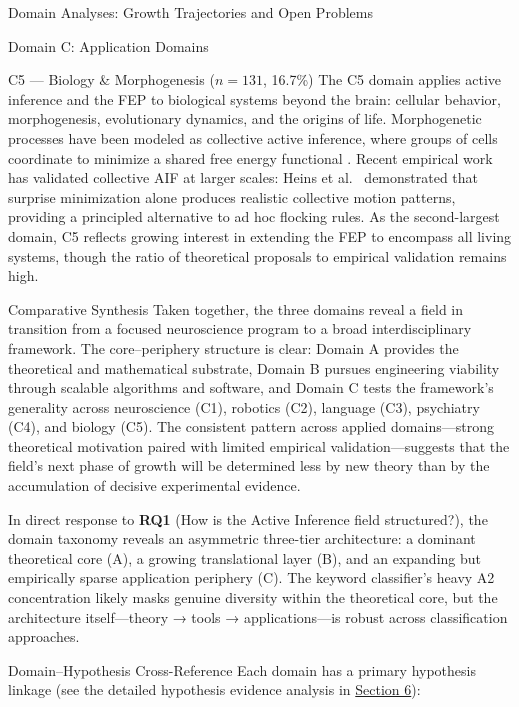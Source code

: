 \documentclass[
  ignorenonframetext,
]{beamer}
\begin{document}
\begin{frame}{Domain Analyses: Growth Trajectories and Open Problems
\label{sec:subfield_analyses}}
\begin{block}{Domain C: Application Domains}
\begin{block}{C5 --- Biology \& Morphogenesis (\(n = 131\), 16.7\%)}
\protect{}\label{c5-biology-morphogenesis-n-131-16.7}
The C5 domain applies active inference and the FEP to biological systems
beyond the brain: cellular behavior, morphogenesis, evolutionary
dynamics, and the origins of life. Morphogenetic processes have been
modeled as collective active inference, where groups of cells coordinate
to minimize a shared free energy functional
\citep{kuchling2020morphogenesis, levin2022technological}. Recent
empirical work has validated collective AIF at larger scales: Heins et
al.~\citep{heins2024collective} demonstrated that surprise minimization
alone produces realistic collective motion patterns, providing a
principled alternative to ad hoc flocking rules. As the second-largest
domain, C5 reflects growing interest in extending the FEP to encompass
all living systems, though the ratio of theoretical proposals to
empirical validation remains high.
\end{block}
\end{block}

\begin{block}{Comparative Synthesis}
\protect{}\label{comparative-synthesis}
Taken together, the three domains reveal a field in transition from a
focused neuroscience program to a broad interdisciplinary framework. The
core--periphery structure is clear: Domain A provides the theoretical
and mathematical substrate, Domain B pursues engineering viability
through scalable algorithms and software, and Domain C tests the
framework's generality across neuroscience (C1), robotics (C2), language
(C3), psychiatry (C4), and biology (C5). The consistent pattern across
applied domains---strong theoretical motivation paired with limited
empirical validation---suggests that the field's next phase of growth
will be determined less by new theory than by the accumulation of
decisive experimental evidence.

In direct response to \textbf{RQ1} (How is the Active Inference field
structured?), the domain taxonomy reveals an asymmetric three-tier
architecture: a dominant theoretical core (A), a growing translational
layer (B), and an expanding but empirically sparse application periphery
(C). The keyword classifier's heavy A2 concentration likely masks
genuine diversity within the theoretical core, but the architecture
itself---theory → tools → applications---is robust across classification
approaches.

\begin{block}{Domain--Hypothesis Cross-Reference}
\protect{}\label{domainhypothesis-cross-reference}
Each domain has a primary hypothesis linkage (see the detailed
hypothesis evidence analysis in
\hyperref[sec:hypothesis_results]{Section 6}):


\end{block}
\end{block}
\end{frame}
\end{document}
